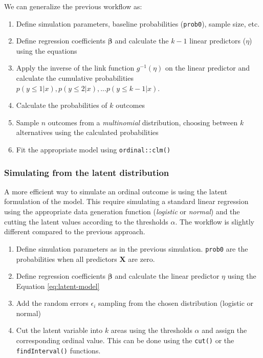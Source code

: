 \documentclass[
  man,floatsintext]{apa6}
\providecommand{\tightlist}{%
  \setlength{\itemsep}{0pt}\setlength{\parskip}{0pt}}
\begin{document}
\normalsize

We can generalize the previous workflow as:

\begin{enumerate}
\def\labelenumi{\arabic{enumi}.}
\tightlist
\item
  Define simulation parameters, baseline probabilities (\texttt{prob0}), sample size, etc.
\item
  Define regression coefficients \(\boldsymbol{\beta}\) and calculate the \(k - 1\) linear predictors (\(\eta\)) using the equations
\item
  Apply the inverse of the link function \(g^{-1}(\eta)\) on the linear predictor and calculate the cumulative probabilities \(p(y \leq 1|x), p(y \leq 2|x), ... p(y \leq k - 1|x)\).
\item
  Calculate the probabilities of \(k\) outcomes
\item
  Sample \(n\) outcomes from a \emph{multinomial} distribution, choosing between \(k\) alternatives using the calculated probabilities
\item
  Fit the appropriate model using \texttt{ordinal::clm()}
\end{enumerate}

\subsubsection{Simulating from the latent distribution}\label{simulating-from-the-latent-distribution}

A more efficient way to simulate an ordinal outcome is using the latent formulation of the model. This require simulating a standard linear regression using the appropriate data generation function (\emph{logistic} or \emph{normal}) and the cutting the latent values according to the thresholds \(\alpha\). The workflow is slightly different compared to the previous approach.

\begin{enumerate}
\def\labelenumi{\arabic{enumi}.}
\tightlist
\item
  Define simulation parameters as in the previous simulation. \texttt{prob0} are the probabilities when all predictors \(\mathbf{X}\) are zero.
\item
  Define regression coefficients \(\boldsymbol{\beta}\) and calculate the linear predictor \(\eta\) using the Equation \eqref{eq:latent-model}
\item
  Add the random errors \(\epsilon_i\) sampling from the chosen distribution (logistic or normal)
\item
  Cut the latent variable into \(k\) areas using the thresholds \(\alpha\) and assign the corresponding ordinal value. This can be done using the \texttt{cut()} or the \texttt{findInterval()} functions.
\end{enumerate}
\end{document}
